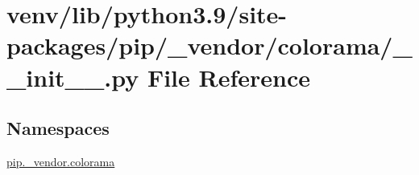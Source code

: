 \hypertarget{venv_2lib_2python3_89_2site-packages_2pip_2__vendor_2colorama_2____init_____8py}{}\section{venv/lib/python3.9/site-\/packages/pip/\+\_\+vendor/colorama/\+\_\+\+\_\+init\+\_\+\+\_\+.py File Reference}
\label{venv_2lib_2python3_89_2site-packages_2pip_2__vendor_2colorama_2____init_____8py}
\subsection*{Namespaces}
\begin{DoxyCompactItemize}
\item 
 \hyperlink{namespacepip_1_1__vendor_1_1colorama}{pip.\+\_\+vendor.\+colorama}
\end{DoxyCompactItemize}
